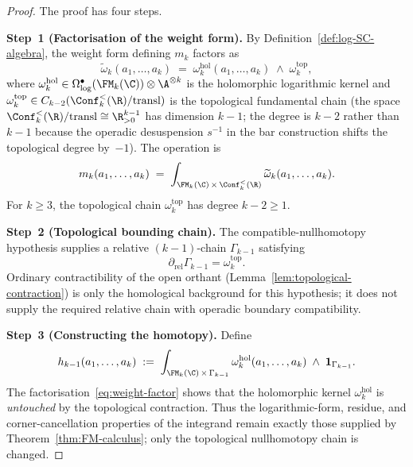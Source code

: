 \begin{proof}
The proof has four steps.

\smallskip
\noindent\textbf{Step~1 (Factorisation of the weight form).}
By Definition~\ref{def:log-SC-algebra}, the weight form defining $m_k$ factors as
\begin{equation}
\label{eq:weight-factor}
\widetilde\omega_k(a_1,\ldots,a_k)
\;=\;
\omega_k^{\mathrm{hol}}(a_1,\ldots,a_k)
\;\wedge\;
\omega_k^{\mathrm{top}},
\end{equation}
where $\omega_k^{\mathrm{hol}}\in\Omega^\bullet_{\log}(\FM_k(\C))\otimes\A^{\otimes k}$
is the holomorphic logarithmic kernel and
$\omega_k^{\mathrm{top}}\in C_{k-2}(\Conf_k^{<}(\R)/\mathrm{transl})$ is the topological
fundamental chain (the space $\Conf_k^{<}(\R)/\mathrm{transl}\cong\R^{k-1}_{>0}$
has dimension $k-1$; the degree is $k-2$ rather than $k-1$ because the operadic
desuspension $s^{-1}$ in the bar construction shifts the topological degree by~$-1$).
The operation is
\[
m_k(a_1,\ldots,a_k)
\;=\;
\int_{\FM_k(\C)\,\times\,\Conf_k^{<}(\R)}
\widetilde\omega_k(a_1,\ldots,a_k).
\]
For $k\ge3$, the topological chain $\omega_k^{\mathrm{top}}$ has degree $k-2\ge1$.

\smallskip
\noindent\textbf{Step~2 (Topological bounding chain).}
The compatible-nullhomotopy hypothesis supplies a relative
$(k{-}1)$-chain $\Gamma_{k-1}$ satisfying
\begin{equation}
\label{eq:bounding-chain}
\partial_{\mathrm{rel}}\Gamma_{k-1}=\omega_k^{\mathrm{top}}.
\end{equation}
Ordinary contractibility of the open orthant
(Lemma~\ref{lem:topological-contraction}) is only the homological
background for this hypothesis; it does not supply the required
relative chain with operadic boundary compatibility.

\smallskip
\noindent\textbf{Step~3 (Constructing the homotopy).}
Define
\begin{equation}
\label{eq:homotopy-def}
h_{k-1}(a_1,\ldots,a_k)
\;:=\;
\int_{\FM_k(\C)\,\times\,\Gamma_{k-1}}
\omega_k^{\mathrm{hol}}(a_1,\ldots,a_k)
\;\wedge\;
\mathbf{1}_{\Gamma_{k-1}}.
\end{equation}
The factorisation~\eqref{eq:weight-factor} shows that the holomorphic kernel
$\omega_k^{\mathrm{hol}}$ is \emph{untouched} by the topological contraction.
Thus the logarithmic-form, residue, and corner-cancellation properties of the
integrand remain exactly those supplied by Theorem~\ref{thm:FM-calculus}; only
the topological nullhomotopy chain is changed.


\end{proof}
